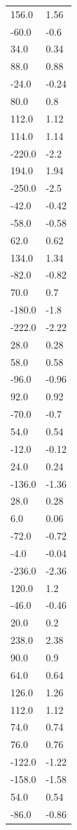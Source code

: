 \begin{longtable}{ll}
156.0 & 1.56 \\
-60.0 & -0.6 \\
34.0 & 0.34 \\
88.0 & 0.88 \\
-24.0 & -0.24 \\
80.0 & 0.8 \\
112.0 & 1.12 \\
114.0 & 1.14 \\
-220.0 & -2.2 \\
194.0 & 1.94 \\
-250.0 & -2.5 \\
-42.0 & -0.42 \\
-58.0 & -0.58 \\
62.0 & 0.62 \\
134.0 & 1.34 \\
-82.0 & -0.82 \\
70.0 & 0.7 \\
-180.0 & -1.8 \\
-222.0 & -2.22 \\
28.0 & 0.28 \\
58.0 & 0.58 \\
-96.0 & -0.96 \\
92.0 & 0.92 \\
-70.0 & -0.7 \\
54.0 & 0.54 \\
-12.0 & -0.12 \\
24.0 & 0.24 \\
-136.0 & -1.36 \\
28.0 & 0.28 \\
6.0 & 0.06 \\
-72.0 & -0.72 \\
-4.0 & -0.04 \\
-236.0 & -2.36 \\
120.0 & 1.2 \\
-46.0 & -0.46 \\
20.0 & 0.2 \\
238.0 & 2.38 \\
90.0 & 0.9 \\
64.0 & 0.64 \\
126.0 & 1.26 \\
112.0 & 1.12 \\
74.0 & 0.74 \\
76.0 & 0.76 \\
-122.0 & -1.22 \\
-158.0 & -1.58 \\
54.0 & 0.54 \\
-86.0 & -0.86 \\

\end{longtable}

